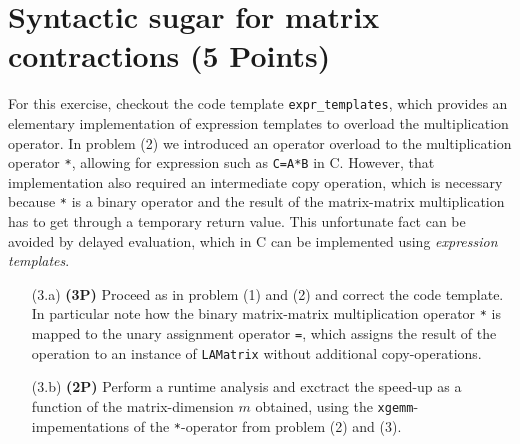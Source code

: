 \documentclass[a4paper, 12pt]{article}
\newcommand\Cpp{C\nolinebreak[4]\hspace{-.05em}\raisebox{.4ex}{\relsize{-3}{\textbf{++}}}}
\begin{document}
%
\section{Syntactic sugar for matrix contractions \textbf{(5 Points)}}
%
For this exercise, checkout the code template \texttt{expr\_templates}, which provides an elementary implementation of expression templates to overload the multiplication operator.
%
In problem (2) we introduced an operator overload to the multiplication operator \texttt{*}, allowing for expression such as \texttt{C=A*B} in \Cpp.
%
However, that implementation also required an intermediate copy operation, which is necessary because \texttt{*} is a binary operator and the result of the matrix-matrix multiplication has to get through a temporary return value.
%
This unfortunate fact can be avoided by delayed evaluation, which in \Cpp{} can be implemented using \textit{expression templates}.
%
\begin{itemize}
	\item[(3.a)] \textbf{(3P)}
	Proceed as in problem (1) and (2) and correct the code template.
	In particular note how the binary matrix-matrix multiplication operator \texttt{*} is mapped to the unary assignment operator \texttt{=}, which assigns the result of the operation to an instance of \texttt{LAMatrix} without additional copy-operations.
	\item[(3.b)] \textbf{(2P)}
	Perform a runtime analysis and exctract the speed-up as a function of the matrix-dimension $m$ obtained, using the \texttt{xgemm}-impementations of the \texttt{*}-operator from problem (2) and (3).
\end{itemize}
%
\batchmode  %
\end{document}

